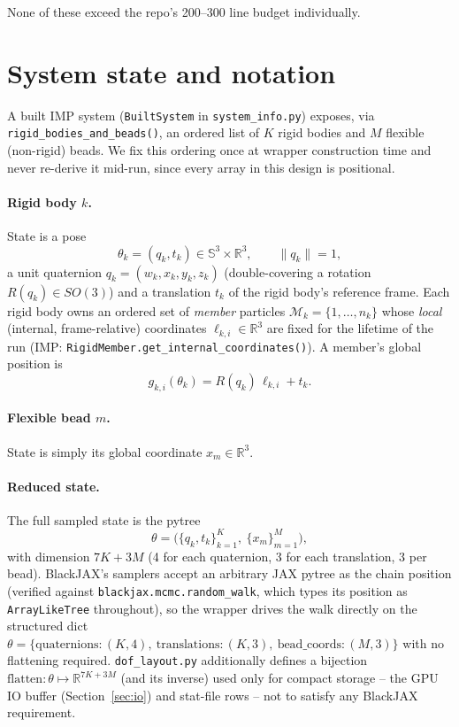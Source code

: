 \documentclass[11pt]{article}
\begin{document}
None of these exceed the repo's 200--300 line budget individually.

\section{System state and notation}
\label{sec:state}

A built IMP system (\texttt{BuiltSystem} in \texttt{system\_info.py}) exposes,
via \texttt{rigid\_bodies\_and\_beads()}, an ordered list of $K$ rigid bodies
and $M$ flexible (non-rigid) beads. We fix this ordering once at wrapper
construction time and never re-derive it mid-run, since every array in this
design is positional.

\paragraph{Rigid body $k$.} State is a pose
\[
  \theta_k = (q_k, t_k) \in \mathbb{S}^3 \times \mathbb{R}^3, \qquad \|q_k\| = 1,
\]
a unit quaternion $q_k = (w_k, x_k, y_k, z_k)$ (double-covering a rotation
$R(q_k) \in SO(3)$) and a translation $t_k$ of the rigid body's reference
frame. Each rigid body owns an ordered set of \emph{member} particles
$\mathcal{M}_k = \{1, \dots, n_k\}$ whose \emph{local} (internal, frame-relative)
coordinates $\ell_{k,i} \in \mathbb{R}^3$ are fixed for the lifetime of the run
(IMP: \texttt{RigidMember.get\_internal\_coordinates()}). A member's global
position is
\begin{equation}
  \label{eq:rigid-transform}
  g_{k,i}(\theta_k) = R(q_k)\, \ell_{k,i} + t_k .
\end{equation}

\paragraph{Flexible bead $m$.} State is simply its global coordinate
$x_m \in \mathbb{R}^3$.

\paragraph{Reduced state.} The full sampled state is the pytree
\[
  \theta = \big(\{q_k, t_k\}_{k=1}^K,\ \{x_m\}_{m=1}^M\big),
\]
with dimension $7K + 3M$ (4 for each quaternion, 3 for each translation, 3
per bead). BlackJAX's samplers accept an arbitrary JAX pytree as the chain
position (verified against \texttt{blackjax.mcmc.random\_walk}, which types
its position as \texttt{ArrayLikeTree} throughout), so the wrapper drives
the walk directly on the structured dict
$\theta = \{\text{quaternions}: (K,4),\ \text{translations}: (K,3),\ \text{bead\_coords}: (M,3)\}$
with no flattening required. \texttt{dof\_layout.py} additionally defines a
bijection $\mathrm{flatten}: \theta \mapsto \mathbb{R}^{7K+3M}$ (and its
inverse) used only for compact storage -- the GPU IO buffer
(Section~\ref{sec:io}) and stat-file rows -- not to satisfy any BlackJAX
requirement.
\end{document}
